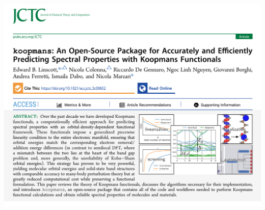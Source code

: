 \documentclass[xcolor=table,aspectratio=169]{beamer}
\numberwithin{equation}{section}
\begin{document}
\begin{frame}{}
   \includegraphics[width=\textwidth]{figures/jctc.png}
\end{frame}
\end{document}
